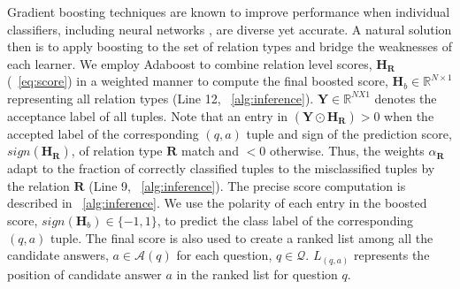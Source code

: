 Gradient boosting techniques are known to improve performance when individual classifiers, including neural networks \cite{ncboost}, are diverse yet accurate. A natural solution then is to apply boosting to the set of relation types and bridge the weaknesses of each learner. We employ Adaboost \cite{adaboost} to combine relation level scores, $\mathbf{H}_{\mathbf{R}}$ (~\cref{eq:score}) in a weighted manner to compute the final boosted score, $\mathbf{H}_b \in \mathbb{R}^{N \times 1}$ representing all relation types (Line 12, ~\cref{alg:inference}). $\mathbf{Y} \in \mathbb{R}^{N X 1}$ denotes the acceptance label of all tuples. Note that an entry in $(\mathbf{Y} \odot \mathbf{H_{\mathbf{R}}}) > 0 $ when the accepted label of the corresponding $(q,a)$ tuple and sign of the prediction score, $sign(\mathbf{H_{\mathbf{R}}})$, of relation type $\mathbf{R}$ match and $< 0$ otherwise. Thus, the weights $\alpha_\mathbf{R}$ adapt to the fraction of correctly classified tuples to the misclassified tuples by the relation $\mathbf{R}$ (Line 9, ~\cref{alg:inference}).
The precise score computation is described in ~\cref{alg:inference}. We use the polarity of each entry in the boosted score, $sign(\mathbf{H}_b) \in \{-1,1 \}$, to predict the class label of the corresponding $(q,a)$ tuple. The final score is also used to create a ranked list among all the candidate answers, $a \in \mathcal{A}(q)$ for each question, $q \in \mathcal{Q}$. $L_{(q,a)}$ represents the position of candidate answer $a$ in the ranked list for question $q$.


